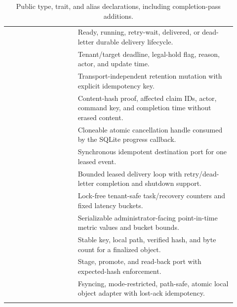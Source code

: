 \begin{longtable}{L{0.29\linewidth}L{0.63\linewidth}}
 & Ready, running, retry-wait, delivered, or dead-letter durable delivery lifecycle. \\
 & Tenant/target deadline, legal-hold flag, reason, actor, and update time. \\
 & Transport-independent retention mutation with explicit idempotency key. \\
 & Content-hash proof, affected claim IDs, actor, command key, and completion time without erased content. \\
 & Cloneable atomic cancellation handle consumed by the SQLite progress callback. \\
 & Synchronous idempotent destination port for one leased event. \\
 & Bounded leased delivery loop with retry/dead-letter completion and shutdown support. \\
 & Lock-free tenant-safe task/recovery counters and fixed latency buckets. \\
 & Serializable administrator-facing point-in-time metric values and bucket bounds. \\
 & Stable key, local path, verified hash, and byte count for a finalized object. \\
 & Stage, promote, and read-back port with expected-hash enforcement. \\
\newline{}\newline{} & Fsyncing, mode-restricted, path-safe, atomic local object adapter with lost-ack idempotency. \\
\bottomrule
\caption{Public type, trait, and alias declarations, including completion-pass additions.}
\end{longtable}

